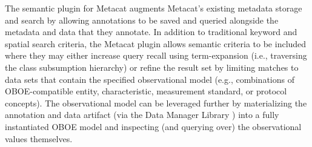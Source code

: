   The semantic plugin for Metacat
augments Metacat's existing metadata storage and search by allowing
annotations to be saved and queried alongside the metadata and data
that they annotate. In addition to traditional keyword and spatial
search criteria, the Metacat plugin allows semantic criteria to be
included where they may either increase query recall using
term-expansion (i.e., traversing the class subsumption hierarchy) or
refine the result set by limiting matches to data sets that contain
the specified observational model (e.g., combinations of
OBOE-compatible entity, characteristic, measurement standard, or
protocol concepts). The observational model can be leveraged further
by materializing the annotation and data artifact (via the Data
Manager Library \cite{leinfelder10:_metad_driven_approac_to_loadin})
into a fully instantiated OBOE model and inspecting (and querying
over) the observational values themselves.

